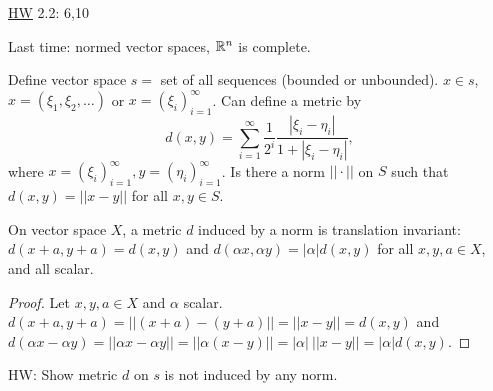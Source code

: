 \documentclass[]{article}
\begin{document}
\ul{HW} 2.2: 6,10

Last time: normed vector spaces, $\mathbb{R}^n$ is complete.

Define vector space $s = $ set of all sequences (bounded or unbounded).
$x\in s$, $x=(\xi_1,\xi_2,\dots)$ or $x=(\xi_i)_{i=1}^\infty$.
Can define a metric by $$d(x,y) = \sum_{i=1}^\infty \frac1{2^i} \frac{|\xi_i-\eta_i|}{1+|\xi_i-\eta_i|},$$ where $x = (\xi_i)_{i=1}^\infty,y=(\eta_i)_{i=1}^\infty$.
Is there a norm $||\cdot||$ on $S$ such that $d(x,y) = ||x-y||$ for all $x,y\in S$.

\begin{theorem}
	 On vector space $X$, a metric $d$ induced by a norm is translation invariant: $d(x+a,y+a)=d(x,y)$ and $d(\alpha x,\alpha y) = |\alpha|d(x,y)$ for all $x,y,a\in X$, and all scalar.
\end{theorem}
\begin{proof}
	Let $x,y,a\in X$ and $\alpha$ scalar.
	$d(x+a,y+a) = ||(x+a)-(y+a)|| = ||x-y|| = d(x,y)$ and
	$d(\alpha x -\alpha y) = ||\alpha x-\alpha y|| = ||\alpha(x-y)|| = |\alpha|\ ||x-y|| = |\alpha| d(x,y)$.
\end{proof}

HW: Show metric $d$ on $s$ is not induced by any norm.
\end{document}
